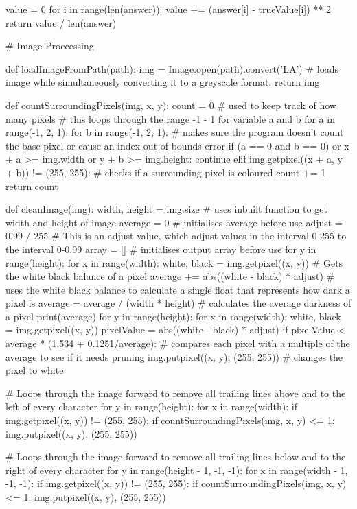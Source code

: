 \documentclass{report}
\begin{document}
\begin{python}
    value = 0
    for i in range(len(answer)):
        value += (answer[i] - trueValue[i]) ** 2
    return value / len(answer)

# Image Proccessing


def loadImageFromPath(path):
    img = Image.open(path).convert('LA')  # loads image while simultaneously converting it to a greyscale format.
    return img


def countSurroundingPixels(img, x, y):
    count = 0  # used to keep track of how many pixels
    # this loops through the range -1 - 1 for variable a and b
    for a in range(-1, 2, 1):
        for b in range(-1, 2, 1):
            # makes sure the program doesn't count the base pixel or cause an index out of bounds error
            if (a == 0 and b == 0) or x + a >= img.width or y + b >= img.height:
                continue
            elif img.getpixel((x + a, y + b)) != (255, 255):  # checks if a surrounding pixel is coloured
                count += 1
    return count


def cleanImage(img):
    width, height = img.size  # uses inbuilt function to get width and height of image
    average = 0  # initialises average before use
    adjust = 0.99 / 255  # This is an adjust value, which adjust values in the interval 0-255 to the interval 0-0.99
    array = []  # initialises output array before use
    for y in range(height):
        for x in range(width):
            white, black = img.getpixel((x, y))  # Gets the white black balance of a pixel
            average += abs((white - black) * adjust)  # uses the white black balance to calculate a single float that represents how dark a pixel is
    average = average / (width * height)  # calculates the average darkness of a pixel
    print(average)
    for y in range(height):
        for x in range(width):
            white, black = img.getpixel((x, y))
            pixelValue = abs((white - black) * adjust)
            if pixelValue < average * (1.534 + 0.1251/average):  # compares each pixel with a multiple of the average to see if it needs pruning
                img.putpixel((x, y), (255, 255))  # changes the pixel to white

    #  Loops through the image forward to remove all trailing lines above and to the left of every character
    for y in range(height):
        for x in range(width):
            if img.getpixel((x, y)) != (255, 255):
                if countSurroundingPixels(img, x, y) <= 1:
                    img.putpixel((x, y), (255, 255))

    #  Loops through the image forward to remove all trailing lines below and to the right of every character
    for y in range(height - 1, -1, -1):
        for x in range(width - 1, -1, -1):
            if img.getpixel((x, y)) != (255, 255):
                if countSurroundingPixels(img, x, y) <= 1:
                    img.putpixel((x, y), (255, 255))


\end{python}
\end{document}

